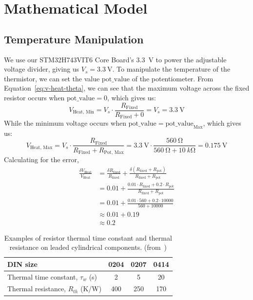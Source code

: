 \documentclass[12pt,a4paper]{article}
\begin{document}
\section{Mathematical Model}

\subsection{Temperature Manipulation}
We use our STM32H743VIT6 Core Board's \SI{3.3}{\volt} to power the adjustable voltage divider, giving us $V_s=\SI{3.3}{\volt}$. To manipulate the temperature of the thermistor, we can set the value $\text{pot\_value}$ of the potentiometer. From Equation~\eqref{eq:v-heat-theta}, we can see that the maximum voltage across the fixed resistor occurs when $\text{pot\_value} = 0$, which gives us:
\begin{equation*}
    V_{\text{Heat, Min}} = V_s \cdot \frac{R_{\text{Fixed}}}{R_{\text{Fixed}} + 0} = V_s = \SI{3.3}{\volt}
\end{equation*}
While the minimum voltage occurs when $\text{pot\_value} = \text{pot\_value}_{\text{Max}}$, which gives us:
\begin{equation*}
    V_{\text{Heat, Max}} = V_s \cdot \frac{R_{\text{Fixed}}}{R_{\text{Fixed}} + R_{\text{Pot, Max}}} = \SI{3.3}{\volt} \cdot \frac{\SI{560}{\ohm}}{\SI{560}{\ohm} + \SI{10}{k\ohm}} = \SI{0.175}{\volt}
\end{equation*}
Calculating for the error,
\begin{align*}
    \frac{\delta V_{\text{Heat}}}{V_{\text{Heat}}} &=  \frac{\delta R_\text{fixed}}{R_\text{fixed}} + \frac{\delta (R_\text{fixed} + R_\text{pot})}{R_\text{fixed} + R_\text{pot}} \\
    &= 0.01 + \frac{0.01 \cdot R_\text{fixed} + 0.2 \cdot R_\text{pot}}{R_\text{fixed} + R_\text{pot}} \\
    &= 0.01 + \frac{0.01 \cdot 560 + 0.2 \cdot 10000}{560 + 10000} \\
    &\approx 0.01 + 0.19 \\
    &\approx 0.2
\end{align*}

\begin{table}[h!]
\centering
\begin{tabular}{lccc}
\hline
\textbf{DIN size} & \textbf{0204} & \textbf{0207} & \textbf{0414} \\
\hline
Thermal time constant, $\tau_w$ (s) & 2 & 5 & 20 \\
Thermal resistance, $R_{th}$ (K/W)  & 400 & 250 & 170 \\
\hline
\end{tabular}
\caption{Examples of resistor thermal time constant and thermal resistance on leaded cylindrical components. (from~\cite{thermal-resistance})}
\label{tab:thermal-resistance}
\end{table}
\end{document}
